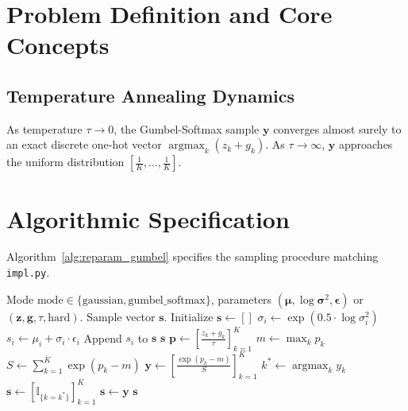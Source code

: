 \documentclass[11pt]{article}
\begin{document}
\section{Problem Definition and Core Concepts}
\label{sec:problem_definition}

\subsection{Temperature Annealing Dynamics}
As temperature $\tau \to 0$, the Gumbel-Softmax sample $\mathbf{y}$ converges almost surely to an exact discrete one-hot vector $\operatorname{argmax}_k(z_k + g_k)$. As $\tau \to \infty$, $\mathbf{y}$ approaches the uniform distribution $\left[\frac{1}{K}, \dots, \frac{1}{K}\right]$.

\section{Algorithmic Specification}
\label{sec:algorithm}

Algorithm~\ref{alg:reparam_gumbel} specifies the sampling procedure matching \texttt{impl.py}.

\begin{algorithm}[H]
\caption{Continuous and Discrete Reparameterization Sampling}
\label{alg:reparam_gumbel}
\begin{algorithmic}[1]
\Require Mode $\mathrm{mode} \in \{\text{gaussian}, \text{gumbel\_softmax}\}$, parameters $(\boldsymbol{\mu}, \log\boldsymbol{\sigma}^2, \boldsymbol{\epsilon})$ or $(\mathbf{z}, \mathbf{g}, \tau, \mathrm{hard})$.
\Ensure Sample vector $\mathbf{s}$.
    \State Initialize $\mathbf{s} \gets []$
        \State $\sigma_i \gets \exp(0.5 \cdot \log\sigma^2_i)$
        \State $s_i \gets \mu_i + \sigma_i \cdot \epsilon_i$
        \State Append $s_i$ to $\mathbf{s}$
    \EndFor
    \State \Return $\mathbf{s}$
\Else
    \State $\mathbf{p} \gets \left[ \frac{z_k + g_k}{\tau} \right]_{k=1}^K$
    \State $m \gets \max_k p_k$
    \State $S \gets \sum_{k=1}^K \exp(p_k - m)$
    \State $\mathbf{y} \gets \left[ \frac{\exp(p_k - m)}{S} \right]_{k=1}^K$
        \State $k^* \gets \operatorname{argmax}_k y_k$
        \State $\mathbf{s} \gets [\mathbb{I}_{\{k = k^*\}}]_{k=1}^K$
    \Else
        \State $\mathbf{s} \gets \mathbf{y}$
    \EndIf
    \State \Return $\mathbf{s}$
\EndIf
\end{algorithmic}
\end{algorithm}
\end{document}
